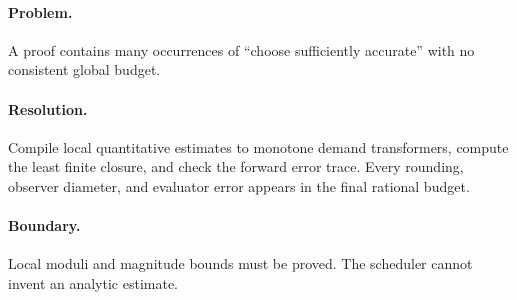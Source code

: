 \paragraph{Problem.}
A proof contains many occurrences of ``choose sufficiently accurate'' with no
consistent global budget.

\paragraph{Resolution.}
Compile local quantitative estimates to monotone demand transformers, compute
the least finite closure, and check the forward error trace.  Every rounding,
observer diameter, and evaluator error appears in the final rational budget.

\paragraph{Boundary.}
Local moduli and magnitude bounds must be proved.  The scheduler cannot invent
an analytic estimate.
